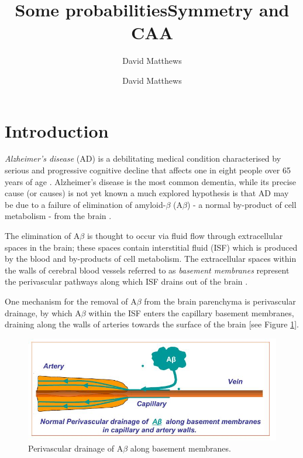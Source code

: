 \documentclass[10pt]{amsart} %
\title{Some probabilities}
\author{David Matthews}
\theoremstyle{definition}
\begin{document}
\title{Symmetry and CAA}
\author{David Matthews}

\section{Introduction}\label{sec:intro}
\emph{Alzheimer's disease} (AD) is a debilitating medical condition characterised by serious and progressive cognitive decline
that affects one in eight people over 65 years of age \cite{Bengt}. Alzheimer's disease is the most common dementia, while its
precise cause (or causes) is not yet known a much explored hypothesis is that AD may be
due to a failure of elimination of amyloid-$\beta$ (A$\beta$) - a normal by-product of cell metabolism 
- from the brain \cite{wellermicro,wellerperi}. 

The elimination of A$\beta$ is thought to occur via fluid flow through extracellular
spaces in the brain; these spaces contain interstitial fluid (ISF) which is produced by the blood and by-products of cell 
metabolism.  The extracellular spaces within the walls of cerebral blood vessels referred to as \emph{basement membranes} represent the perivascular pathways along which ISF drains out of the
brain \cite{wellermicro,wellerperi,Rox}.  

One mechanism for the removal of A$\beta$ from the brain parenchyma is perivascular drainage, by which A$\beta$ within the ISF enters the capillary basement membranes, draining along the walls of 
arteries towards the surface of the brain [see Figure \ref{fig:1}]. 

\begin{figure}[h]

              \centering
               \includegraphics[scale=0.6]{drainage.jpg}
                \caption{Perivascular drainage of A$\beta$ along basement membranes.}\label{fig:1}
\end{figure}
\end{document}
